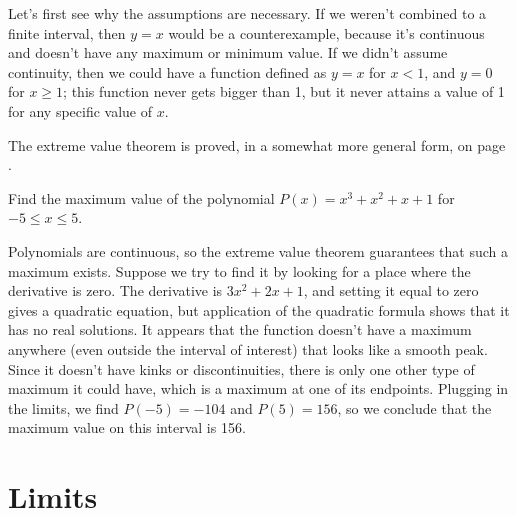 Let's first see why the assumptions are necessary. If we weren't combined to a finite interval, then
$y=x$ would be a counterexample, because it's continuous and doesn't have any maximum or minimum value.
If we didn't assume continuity, then we could have a function defined as $y=x$ for $x < 1$, and $y=0$ for
$x \ge 1$; this function never gets bigger than 1, but it never attains a value of 1 for any specific value of $x$.

The extreme value theorem is proved, in a somewhat more general form, on page \pageref{detour:extreme-value}.

\vfill\pagebreak

\begin{eg}
\egquestion Find the maximum value of the polynomial $P(x)=x^3+x^2+x+1$ for $-5 \le x \le 5$.

\eganswer Polynomials are continuous, so the extreme value theorem guarantees that such a
maximum exists. Suppose we try to find it by looking for a place where the derivative is zero.
The derivative is $3x^2+2x+1$, and setting it equal to zero gives a quadratic equation, but application of the
quadratic formula shows that it has no real solutions. It appears that the function doesn't have a maximum
anywhere (even outside the interval of interest) that looks like a smooth peak. Since it doesn't have kinks or
discontinuities, there is only one other type of maximum it could have, which is a maximum at one
of its endpoints. Plugging in the limits, we find $P(-5)=-104$ and $P(5)=156$, so we conclude that
the maximum value on this interval is 156.
\end{eg}

\vfill\pagebreak

\section{Limits}\label{sec:limits}

